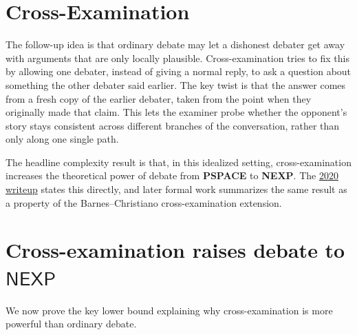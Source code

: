 \documentclass[11pt]{article}
\begin{document}
\section{Cross-Examination}
\label{sec:cxprose}

The follow-up idea is that ordinary debate may let a dishonest debater get away
with arguments that are only locally plausible. Cross-examination tries to fix
this by allowing one debater, instead of giving a normal reply, to ask a question
about something the other debater said earlier. The key twist is that the answer
comes from a fresh copy of the earlier debater, taken from the point when they
originally made that claim. This lets the examiner probe whether the opponent's
story stays consistent across different branches of the conversation, rather than
only along one single path.

The headline complexity result is that, in this idealized setting,
cross-examination increases the theoretical power of debate from \textbf{PSPACE}
to \textbf{NEXP}. The
\href{https://www.alignmentforum.org/posts/Br4xDbYu4Frwrb64a/writeup-progress-on-ai-safety-via-debate-1}{2020 writeup}
states this directly, and later formal work summarizes the same result as a
property of the Barnes--Christiano cross-examination extension.


\section{Cross-examination raises debate to \(\mathsf{NEXP}\)}
\label{sec:cxnexp}

We now prove the key lower bound explaining why cross-examination is more powerful than ordinary debate.
\end{document}
